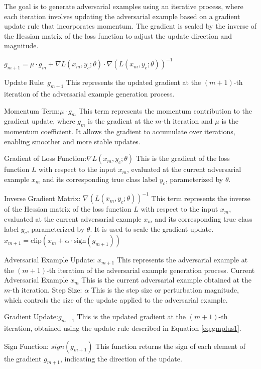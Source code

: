 The goal is to generate adversarial examples using an iterative process, where each iteration involves updating the adversarial example based on a gradient update rule that incorporates momentum. The gradient is scaled by the inverse of the Hessian matrix of the loss function to adjust the update direction and magnitude.

$g_{m+1} = \mu \cdot g_m + \nabla L(x_m, y_c; \theta) \cdot \nabla(L(x_m, y_c; \theta))^{-1} \label{eq:gmplus1}$

Update Rule: $g_{m+1}$ This represents the updated gradient at the \((m+1)\)-th iteration of the adversarial example generation process.

Momentum Term:$\mu \cdot g_m$ This term represents the momentum contribution to the gradient update, where \(g_m\) is the gradient at the \(m\)-th iteration and \(\mu\) is the momentum coefficient. It allows the gradient to accumulate over iterations, enabling smoother and more stable updates.

Gradient of Loss Function:$\nabla L(x_m, y_c; \theta)$ This is the gradient of the loss function \(L\) with respect to the input \(x_m\), evaluated at the current adversarial example \(x_m\) and its corresponding true class label \(y_c\), parameterized by \(\theta\).

Inverse Gradient Matrix: $\nabla(L(x_m, y_c; \theta))^{-1}$ This term represents the inverse of the Hessian matrix of the loss function \(L\) with respect to the input \(x_m\), evaluated at the current adversarial example \(x_m\) and its corresponding true class label \(y_c\), parameterized by \(\theta\). 
It is used to scale the gradient update.$x_{m+1} = \text{clip} \left( x_m + \alpha \cdot \text{sign}(g_{m+1}) \right) \label{eq:xmplus1}$

Adversarial Example Update: $x_{m+1}$ This represents the adversarial example at the \((m+1)\)-th iteration of the adversarial example generation process.
Current Adversarial Example $x_m$ This is the current adversarial example obtained at the \(m\)-th iteration.
Step Size: $\alpha$ This is the step size or perturbation magnitude, which controls the size of the update applied to the adversarial example.

Gradient Update:$g_{m+1}$ This is the updated gradient at the \((m+1)\)-th iteration, obtained using the update rule described in Equation \ref{eq:gmplus1}.

Sign Function: ${sign}(g_{m+1})$ This function returns the sign of each element of the gradient \(g_{m+1}\), indicating the direction of the update.

